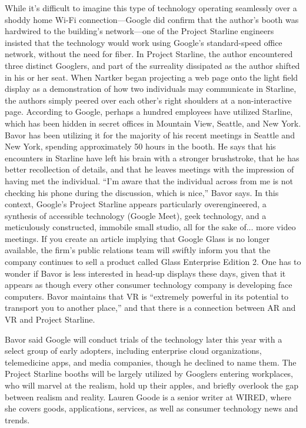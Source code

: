 While it's difficult to imagine this type of technology operating seamlessly over a shoddy home Wi-Fi connection—Google did confirm that the author's booth was hardwired to the building's network—one of the Project Starline engineers insisted that the technology would work using Google's standard-speed office network, without the need for fiber.
In Project Starline, the author encountered three distinct Googlers, and part of the surreality dissipated as the author shifted in his or her seat.
When Nartker began projecting a web page onto the light field display as a demonstration of how two individuals may communicate in Starline, the authors simply peered over each other's right shoulders at a non-interactive page.
According to Google, perhaps a hundred employees have utilized Starline, which has been hidden in secret offices in Mountain View, Seattle, and New York.
Bavor has been utilizing it for the majority of his recent meetings in Seattle and New York, spending approximately 50 hours in the booth.
He says that his encounters in Starline have left his brain with a stronger brushstroke, that he has better recollection of details, and that he leaves meetings with the impression of having met the individual.
“I'm aware that the individual across from me is not checking his phone during the discussion, which is nice,” Bavor says.
In this context, Google's Project Starline appears particularly overengineered, a synthesis of accessible technology (Google Meet), geek technology, and a meticulously constructed, immobile small studio, all for the sake of... more video meetings.
If you create an article implying that Google Glass is no longer available, the firm's public relations team will swiftly inform you that the company continues to sell a product called Glass Enterprise Edition 2.
One has to wonder if Bavor is less interested in head-up displays these days, given that it appears as though every other consumer technology company is developing face computers.
Bavor maintains that VR is “extremely powerful in its potential to transport you to another place,” and that there is a connection between AR and VR and Project Starline.

Bavor said Google will conduct trials of the technology later this year with a select group of early adopters, including enterprise cloud organizations, telemedicine apps, and media companies, though he declined to name them.
The Project Starline booths will be largely utilized by Googlers entering workplaces, who will marvel at the realism, hold up their apples, and briefly overlook the gap between realism and reality.
Lauren Goode is a senior writer at WIRED, where she covers goods, applications, services, as well as consumer technology news and trends.
